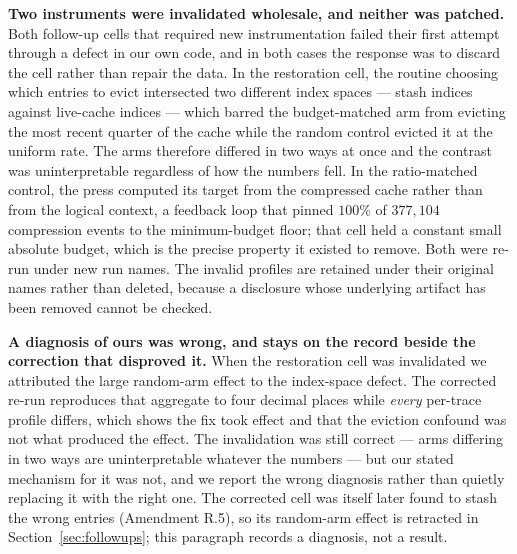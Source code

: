 \documentclass{article}
\begin{document}
\textbf{Two instruments were invalidated wholesale, and neither was patched.}
Both follow-up cells that required new instrumentation failed their first
attempt through a defect in our own code, and in both cases the response was to
discard the cell rather than repair the data. In the restoration cell, the
routine choosing which entries to evict intersected two different index spaces
--- stash indices against live-cache indices --- which barred the budget-matched
arm from evicting the most recent quarter of the cache while the random control
evicted it at the uniform rate. The arms therefore differed in two ways at once
and the contrast was uninterpretable regardless of how the numbers fell. In the
ratio-matched control, the press computed its target from the compressed cache
rather than from the logical context, a feedback loop that pinned $100\%$ of
$377{,}104$ compression events to the minimum-budget floor; that cell held a
constant small absolute budget, which is the precise property it existed to
remove. Both were re-run under new run names. The invalid profiles are retained
under their original names rather than deleted, because a disclosure whose
underlying artifact has been removed cannot be checked.

\textbf{A diagnosis of ours was wrong, and stays on the record beside the
correction that disproved it.} When the restoration cell was invalidated we
attributed the large random-arm effect to the index-space defect. The corrected
re-run reproduces that aggregate to four decimal places while \emph{every}
per-trace profile differs, which shows the fix took effect and that the eviction
confound was not what produced the effect. The invalidation was still correct
--- arms differing in two ways are uninterpretable whatever the numbers --- but
our stated mechanism for it was not, and we report the wrong diagnosis rather
than quietly replacing it with the right one. The corrected cell was itself
later found to stash the wrong entries (Amendment R.5), so its random-arm effect
is retracted in Section~\ref{sec:followups}; this paragraph records a
diagnosis, not a result.
\end{document}
